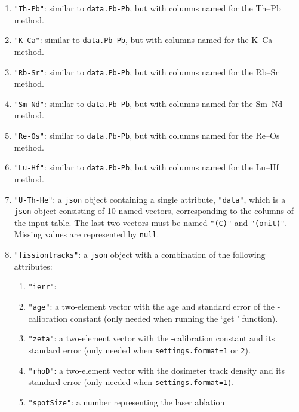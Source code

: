 \begin{refsection}
\begin{enumerate}[leftmargin=\parindent,align=left,
      labelwidth=\parindent,label*=3.\arabic*.]
\begin{enumerate}[leftmargin=\parindent,align=left,
      labelwidth=\parindent,label*=\arabic*.]
      input table. The last two vectors must be named \texttt{"(C)"}
      and \texttt{"(omit)"}. Missing values are represented by
      \texttt{null}.
  \end{enumerate} 
\item{\tt "Th-Pb"}: similar to \texttt{data.Pb-Pb}, but with columns
  named for the Th--Pb method.
\item{\tt "K-Ca"}: similar to \texttt{data.Pb-Pb}, but with columns
  named for the K--Ca method.
\item{\tt "Rb-Sr"}: similar to \texttt{data.Pb-Pb}, but with columns
  named for the Rb--Sr method.
\item{\tt "Sm-Nd"}: similar to \texttt{data.Pb-Pb}, but with columns
  named for the Sm--Nd method.
\item{\tt "Re-Os"}: similar to \texttt{data.Pb-Pb}, but with columns
  named for the Re--Os method.
\item{\tt "Lu-Hf"}: similar to \texttt{data.Pb-Pb}, but with columns
  named for the Lu--Hf method.
\item{\tt "U-Th-He"}: a \texttt{json} object containing a single
  attribute, \texttt{"data"}, which is a \texttt{json} object
  consisting of 10 named vectors, corresponding to the columns of the
  input table. The last two vectors must be named \texttt{"(C)"} and
  \texttt{"(omit)"}. Missing values are represented by
      \texttt{null}.
\item{\tt "fissiontracks"}: a \texttt{json} object with a combination
  of the following attributes:
  \begin{enumerate}[leftmargin=\parindent,align=left,
      labelwidth=\parindent,label*=\arabic*.]
    \item{\tt "ierr"}: 
    \item{\tt "age"}: a two-element vector with the age and standard
      error of the \textzeta-calibration constant (only needed when
      running the `get \textzeta' function).
    \item{\tt "zeta"}: a two-element vector with the
      \textzeta-calibration constant and its standard error (only
      needed when \texttt{settings.format=1} or \texttt{2}).
    \item{\tt "rhoD"}: a two-element vector with the dosimeter track
      density and its standard error (only needed when
      \texttt{settings.format=1}).
    \item{\tt "spotSize"}: a number representing the laser ablation

\end{enumerate}
\end{enumerate}
\end{refsection}
